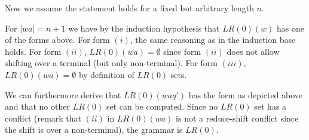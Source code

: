 \begin{solution}
Now we assume the statement holds for a fixed but arbitrary length $n$.

For $|wa|=n+1$ we have by the induction hypothesis that $LR(0)(w)$ has one of the forms above. For form $(i)$, the same reasoning as in the induction base holds. For form $(ii)$, $LR(0)(wa)=\emptyset$ since form $(ii)$ does not allow shifting over a terminal (but only non-terminal). For form $(iii)$, $LR(0)(wa)=\emptyset$ by definition of $LR(0)$ sets.

We can furthermore derive that $LR(0)(w a q')$ has the form as depicted above and that no other $LR(0)$ set can be computed.
Since no $LR(0)$ set has a conflict (remark that $(ii)$ in $LR(0)(w a)$ is not a reduce-shift conflict since the shift is over a non-terminal), the grammar is $LR(0)$.
\end{solution}
